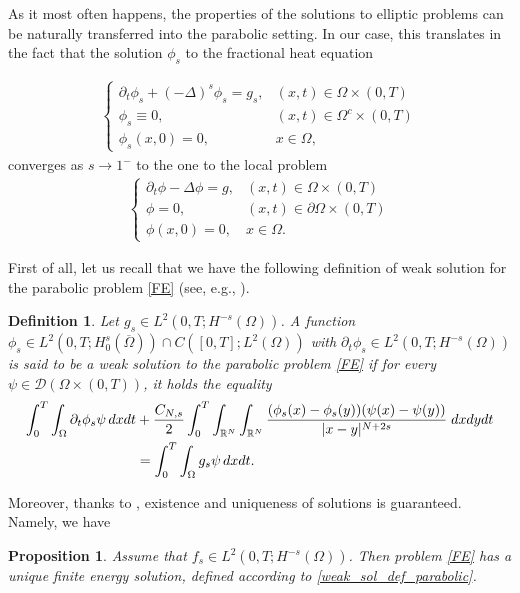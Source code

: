 \documentclass[reqno,twoside]{amsart}
\newtheorem{definition}[theorem]{Definition}
\newtheorem{proposition}[theorem]{Proposition}
\numberwithin{equation}{section}
\def\RR{{\mathbb{R}}}
\newcommand{\fl}[2]{(-\Delta)^#1#2}
\begin{document}
As it most often happens, the properties of the solutions to elliptic problems can be naturally transferred into the parabolic setting. In our case, this translates in the fact that the solution $\phi_s$ to the fractional heat equation

\begin{align}\label{FE}
	\begin{cases}
		\partial_t\phi_s + \fl{s}{\phi_s} = g_s, &(x,t)\in\Omega\times(0,T)\tag{$\mathcal H_s$}
		\\
		\phi_s\equiv 0, & (x,t)\in\Omega^c\times(0,T)
		\\
		\phi_s(x,0) = 0, & x\in\Omega,
	\end{cases}
\end{align}
converges as $s\to 1^-$ to the one to the local problem 
\begin{align}\label{HE}
	\begin{cases}
		\partial_t\phi -\Delta\phi = g, &(x,t)\in\Omega\times(0,T)\tag{$\mathcal H$}
		\\
		\phi= 0, & (x,t)\in\partial\Omega\times(0,T)
		\\
		\phi(x,0) = 0, & x\in\Omega.
	\end{cases}
\end{align}

First of all, let us recall that we have the following definition of weak solution for the parabolic problem \eqref{FE} (see, e.g., \cite{leonori2015basic}).
\begin{definition}\label{weak_sol_def_parabolic}
Let $g_s\in L^2(0,T;H^{-s}(\Omega))$. A function $\phi_s\in L^2(0,T;H_0^s(\overline{\Omega}))\cap C([0,T];L^2(\Omega))$ with $\partial_t\phi_s\in L^2(0,T;H^{-s}(\Omega))$ is said to be a weak solution to the parabolic problem \eqref{FE} if for every $\psi\in\mathcal{D}(\Omega\times(0,T))$, it holds the equality
\begin{align}\label{weak-sol-par}
	\int_0^T \int_\Omega\partial_t\phi_s\psi\,dxdt &+ \frac{C_{N,s}}{2}\int_0^T\int_{\RR^N}\int_{\RR^N}\frac{(\phi_s(x)-\phi_s(y))(\psi(x)-\psi(y))}{|x-y|^{N+2s}}\;dxdydt \notag
	\\
	&= \int_0^T\int_\Omega g_s\psi\,dxdt.
\end{align}
\end{definition}

Moreover, thanks to \cite[Theorem 26]{leonori2015basic}, existence and uniqueness of solutions is guaranteed. Namely, we have

\begin{proposition}
Assume that $f_s\in L^2(0,T;H^{-s}(\Omega))$. Then problem \eqref{FE} has a unique finite energy solution, defined according to \eqref{weak_sol_def_parabolic}.
\end{proposition}
\end{document}
